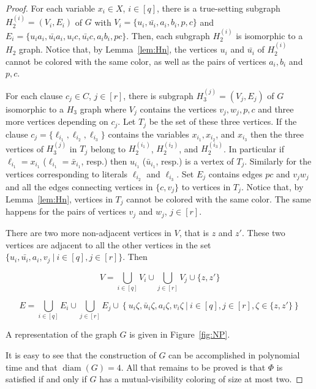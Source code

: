 \documentclass[12pt]{article}
\newcommand{\diam}{\mathop{\mathrm{diam}}}
\begin{document}
\begin{proof}
For each variable $x_i\in X$, $i\in [q]$, there is a true-setting  subgraph $H_2^{(i)}=(V_i,E_i)$ of $G$ with $V_i=\{u_{i},\bar{u_i},a_i,b_i,p,c\}$ and $E_i=\{u_{i}a_i,\bar{u_i}a_i,u_{i}c,\bar{u_i}c, a_ib_i, pc\}$. Then, each subgraph $H_2^{(i)}$ is isomorphic to a $H_2$ graph. Notice that, by Lemma~\ref{lem:Hn}, the vertices $u_{i}$ and $\bar{u_i}$ of $H_2^{(i)}$ cannot be colored with the same color, as well as the pairs of vertices $a_i,b_i$ and $p,c$.

For each clause $c_j \in C$, $j\in [r]$, there is subgraph $H_3^{(j)}=(V_j,E_j)$ of $G$ isomorphic to a $H_3$ graph where $V_j$ contains the vertices $v_j,w_j,p,c$ and three more vertices depending on $c_j$. Let $T_j$ be the set of these three vertices. If the clause $c_j=\{\ell_{i_1},\ell_{i_2},\ell_{i_3}\}$ contains the variables $x_{i_1},x_{i_2}$, and $x_{i_3}$ then the three vertices of $H_3^{(j)}$ in $T_j$ belong to $H_2^{(i_1)}$, $H_2^{(i_2)}$, and $H_2^{(i_3)}$. In particular if $\ell_{i_1}=x_{i_1}$  ($\ell_{i_1}=\bar x_{i_1}$, resp.)  then $u_{i_1}$ ($\bar u_{i_1}$, resp.) is a vertex of $T_j$.  Similarly for the vertices corresponding to literals $\ell_{i_2}$ and $\ell_{i_3}$. Set $E_j$ contains edges $pc$ and $v_jw_j$ and all the edges connecting  vertices in $\{c, v_j\}$ to vertices in $T_j$. Notice that, by Lemma~\ref{lem:Hn}, vertices in $T_j$ cannot be colored with the same color. The same happens for the pairs of vertices $v_j$ and $w_j$, $j\in[r]$.

There are two more non-adjacent vertices in $V$, that is $z$ and $z'$. These two vertices are adjacent to all the other vertices in the set $\{u_i,\bar{u_i},a_i,v_j~|~i\in[q], j\in[r]\}$. Then

$$ V=\bigcup_{i\in [q]} V_i \cup \bigcup_{j\in [r]}V_j\cup\{z,z'\}$$

$$ E=\bigcup_{i\in [q]} E_i \cup \bigcup_{j\in[r]} E_j\cup\left\{u_{i}\zeta,\bar u_{i}\zeta,a_{i}\zeta,v_i\zeta~|~i\in[q],j\in[r],\zeta\in\{z,z'\}\right\}$$


\bigskip
A representation of the graph $G$ is given in Figure~\ref{fig:NP}.

\bigskip
It is easy to see that the construction of $G$ can be accomplished in polynomial time and that $\diam(G)=4$. All that remains to be proved is that $\Phi$ is satisfied if and only if $G$ has a mutual-visibility coloring of size at most two.


\end{proof}
\end{document}
